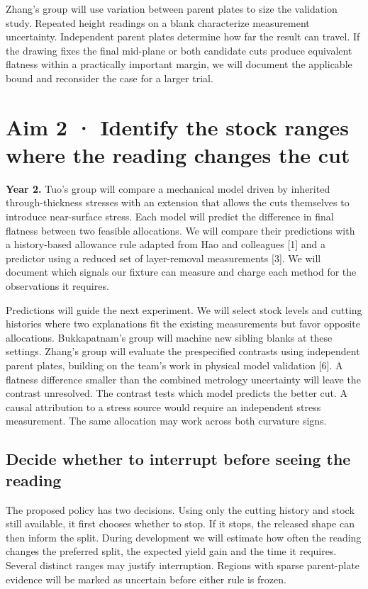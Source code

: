 \documentclass[11pt,letterpaper]{article}
\begin{document}
Zhang’s group will use variation between parent plates to size the validation study. Repeated height readings on a blank characterize measurement uncertainty. Independent parent plates determine how far the result can travel. If the drawing fixes the final mid-plane or both candidate cuts produce equivalent flatness within a practically important margin, we will document the applicable bound and reconsider the case for a larger trial.

\newpage

\section*{Aim 2 · Identify the stock ranges where the reading changes the cut}

\textbf{Year 2.} Tuo’s group will compare a mechanical model driven by inherited through-thickness stresses with an extension that allows the cuts themselves to introduce near-surface stress. Each model will predict the difference in final flatness between two feasible allocations. We will compare their predictions with a history-based allowance rule adapted from Hao and colleagues [1] and a predictor using a reduced set of layer-removal measurements [3]. We will document which signals our fixture can measure and charge each method for the observations it requires.

Predictions will guide the next experiment. We will select stock levels and cutting histories where two explanations fit the existing measurements but favor opposite allocations. Bukkapatnam’s group will machine new sibling blanks at these settings. Zhang’s group will evaluate the prespecified contrasts using independent parent plates, building on the team’s work in physical model validation [6]. A flatness difference smaller than the combined metrology uncertainty will leave the contrast unresolved. The contrast tests which model predicts the better cut. A causal attribution to a stress source would require an independent stress measurement. The same allocation may work across both curvature signs.

\subsection*{Decide whether to interrupt before seeing the reading}

The proposed policy has two decisions. Using only the cutting history and stock still available, it first chooses whether to stop. If it stops, the released shape can then inform the split. During development we will estimate how often the reading changes the preferred split, the expected yield gain and the time it requires. Several distinct ranges may justify interruption. Regions with sparse parent-plate evidence will be marked as uncertain before either rule is frozen.
\end{document}
